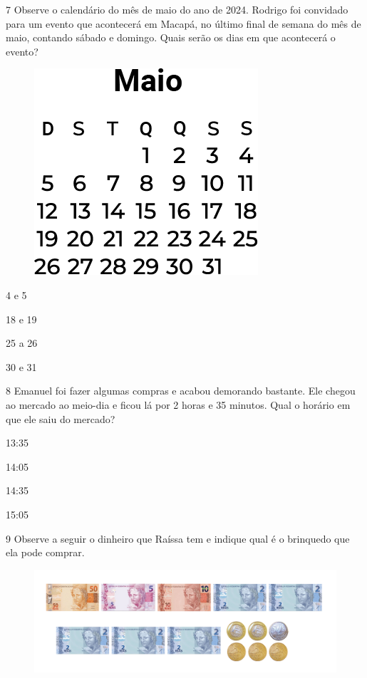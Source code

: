 \num{7} Observe o calendário do mês de maio do ano de 2024. Rodrigo foi
convidado para um evento que acontecerá em Macapá, no último final de
semana do mês de maio, contando sábado e domingo. Quais serão os dias em que acontecerá o evento?

\begin{figure}[H]
\centering
\includegraphics[width=.35\textwidth]{./media/image155.png}
\end{figure}

\begin{escolha}[itemsep=-5pt]
\begin{multicols}{2}
\item 4 e 5

\item 18 e 19

\item 25 a 26

\item 30 e 31
\end{multicols}
\end{escolha}

\num{8} Emanuel foi fazer algumas compras e acabou demorando bastante. Ele chegou ao mercado ao meio-dia e ficou lá por 2 horas e 35 minutos. Qual
o horário em que ele saiu do mercado?

\begin{escolha}[itemsep=-5pt]
\item 13:35

\item 14:05

\item 14:35

\item 15:05
\end{escolha}

\num{9} Observe a seguir o dinheiro que Raíssa tem e indique qual é o brinquedo que ela pode comprar.

\begin{figure}[H]
\includegraphics[width=\textwidth]{./media/image156.png}
\end{figure}

